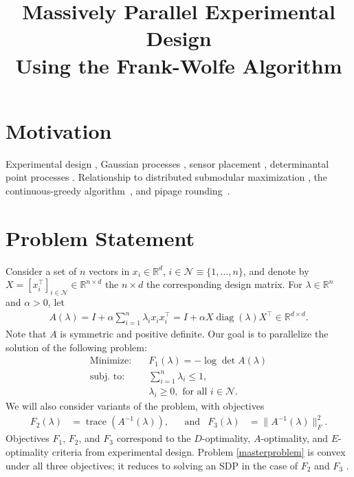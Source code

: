 \documentclass[11pt, oneside]{article}
\title{Massively Parallel Experimental Design \\Using the Frank-Wolfe Algorithm}\author{}
\newcommand{\reals}{\ensuremath{\mathbb{R}}}
\newcommand{\trace}{\mathop{\mathrm{trace}}}
\newcommand{\diag}{\mathop{\mathrm{diag}}}
\begin{document}
\maketitle

\section{Motivation}

Experimental design \cite{boyd2004convex}, Gaussian processes \cite{krause2007nonmyopic,rasmussen2006gaussian}, sensor placement \cite{krause2007nonmyopic,summers2013optimal},  determinantal point processes \cite{kulesza2012determinantal}. Relationship to distributed submodular maximization \cite{mirzasoleiman2013distributed}, the continuous-greedy algorithm~\cite{vondrak2010submodularity}, and pipage rounding~\cite{ageev2004pipage}.

\section{Problem Statement}

Consider a set of $n$ vectors in  $x_i\in \reals^d$, $i\in \mathcal{N} \equiv \{1,\ldots, n\}$, and denote by $X=[x_i^\top]_{i\in \mathcal{N}}\in \reals^{n\times d}$ the $n\times d$ the corresponding design matrix. For $\lambda \in \reals^n$ and $\alpha>0$, let 
\begin{align}A(\lambda) = I+ \alpha \sum_{i=1}^n \lambda_i x_ix_i^\top = I+ \alpha X\diag(\lambda)X^\top\in \reals^{d\times d}. \label{Amat}\end{align}
Note that $A$ is symmetric and positive definite. Our goal is to parallelize the solution of the following problem:
\begin{subequations} \label{masterproblem}
\begin{align}
\text{Minimize:}\quad &F_1(\lambda) =-\log\det A(\lambda)\\
\text{subj.~to:}\quad &\sum_{i=1}^n \lambda_i \leq 1,\\
&\lambda_i \geq 0, \text{ for all }i\in\mathcal{N}.
\end{align} 
\end{subequations}
We will also consider variants of the problem, with objectives 
\begin{align}F_2(\lambda) &= \trace\left( A^{-1}(\lambda) \right),& &\text{and} &   F_3(\lambda)&=\|A^{-1}(\lambda)\|_F^2. \end{align}
Objectives $F_1$, $F_2$, and $F_3$ correspond to the $D$-optimality, $A$-optimality, and $E$-optimality criteria from experimental design.  Problem \eqref{masterproblem} is convex under all three objectives; it reduces to solving an SDP in the case of $F_2$ and $F_3$ \cite{boyd2004convex}.
\end{document}

